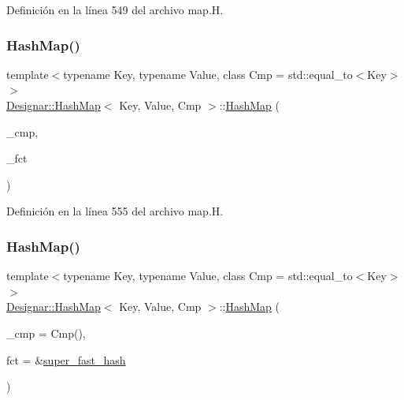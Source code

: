 Definición en la línea 549 del archivo map.\+H.

\mbox{\label{class_designar_1_1_hash_map_ad1b22ee9f50a5be7febcf622ae8cb31a}} 
\subsubsection{\texorpdfstring{Hash\+Map()}{HashMap()}\hspace{0.1cm}{\footnotesize\ttfamily [3/7]}}
{\footnotesize\ttfamily template$<$typename Key, typename Value, class Cmp = std\+::equal\+\_\+to$<$\+Key$>$$>$ \\
\hyperlink{class_designar_1_1_hash_map}{Designar\+::\+Hash\+Map}$<$ Key, Value, Cmp $>$\+::\hyperlink{class_designar_1_1_hash_map}{Hash\+Map} (\begin{DoxyParamCaption}\item[{Cmp \&}]{\+\_\+cmp,  }\item[{Hash\+Fct\+Ptr}]{\+\_\+fct }\end{DoxyParamCaption})\hspace{0.3cm}{\ttfamily [inline]}}



Definición en la línea 555 del archivo map.\+H.

\mbox{\label{class_designar_1_1_hash_map_ad310e763bce2806e390fde121efe92c6}} 
\subsubsection{\texorpdfstring{Hash\+Map()}{HashMap()}\hspace{0.1cm}{\footnotesize\ttfamily [4/7]}}
{\footnotesize\ttfamily template$<$typename Key, typename Value, class Cmp = std\+::equal\+\_\+to$<$\+Key$>$$>$ \\
\hyperlink{class_designar_1_1_hash_map}{Designar\+::\+Hash\+Map}$<$ Key, Value, Cmp $>$\+::\hyperlink{class_designar_1_1_hash_map}{Hash\+Map} (\begin{DoxyParamCaption}\item[{Cmp \&\&}]{\+\_\+cmp = {\ttfamily Cmp()},  }\item[{Hash\+Fct\+Ptr}]{fct = {\ttfamily \&\hyperlink{namespace_designar_afd5712d16b3ae1c1c7d59f1004cd96fd}{super\+\_\+fast\+\_\+hash}} }\end{DoxyParamCaption})\hspace{0.3cm}{\ttfamily [inline]}}



